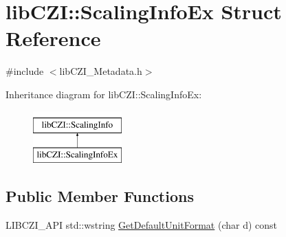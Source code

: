 \hypertarget{structlib_c_z_i_1_1_scaling_info_ex}{}\section{lib\+C\+ZI\+:\+:Scaling\+Info\+Ex Struct Reference}
\label{structlib_c_z_i_1_1_scaling_info_ex}


{\ttfamily \#include $<$lib\+C\+Z\+I\+\_\+\+Metadata.\+h$>$}

Inheritance diagram for lib\+C\+ZI\+:\+:Scaling\+Info\+Ex\+:\begin{figure}[H]
\begin{center}
\leavevmode
\includegraphics[height=2.000000cm]{structlib_c_z_i_1_1_scaling_info_ex}
\end{center}
\end{figure}
\subsection*{Public Member Functions}
\begin{DoxyCompactItemize}
\item 
L\+I\+B\+C\+Z\+I\+\_\+\+A\+PI std\+::wstring \hyperlink{structlib_c_z_i_1_1_scaling_info_ex_a65dda3ab892e628177790061a43a80e9}{Get\+Default\+Unit\+Format} (char d) const
\end{DoxyCompactItemize}
